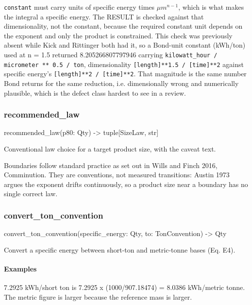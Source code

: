 \documentclass[10pt,a4paper,twoside]{report}
\begin{document}
\texttt{constant} must carry units of specific energy times $\mu m^{n-1}$, which is what makes the integral a specific energy. The RESULT is checked against that dimensionality, not the constant, because the required constant unit depends on the exponent and only the product is constrained. This check was previously absent while Kick and Rittinger both had it, so a Bond-unit constant (kWh/ton) used at n = 1.5 returned 8.205266807797946 carrying \texttt{kilowatt\_hour / micrometer ** 0.5 / ton}, dimensionality \texttt{[length]**1.5 / [time]**2} against specific energy's \texttt{[length]**2 / [time]**2}. That magnitude is the same number Bond returns for the same reduction, i.e. dimensionally wrong and numerically plausible, which is the defect class hardest to see in a review.

\subsubsection*{recommended\_law}

\begin{verbatimsmall}
recommended_law(p80: Qty) -> tuple[SizeLaw, str]
\end{verbatimsmall}

Conventional law choice for a target product size, with the caveat text.

Boundaries follow standard practice as set out in Wills and Finch 2016, Comminution. They are conventions, not measured transitions: Austin 1973 argues the exponent drifts continuously, so a product size near a boundary has no single correct law.

\subsubsection*{convert\_ton\_convention}

\begin{verbatimsmall}
convert_ton_convention(specific_energy: Qty, to: TonConvention) -> Qty
\end{verbatimsmall}

Convert a specific energy between short-ton and metric-tonne bases (Eq. E4).

\paragraph*{Examples}

7.2925 kWh/short ton is 7.2925 x (1000/907.18474) = 8.0386 kWh/metric tonne. The metric figure is larger because the reference mass is larger.
\end{document}
